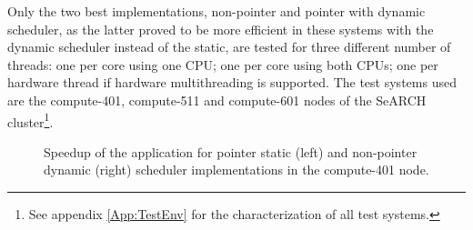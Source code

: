 Only the two best implementations, non-pointer and pointer with dynamic scheduler, as the latter proved to be more efficient in these systems with the dynamic scheduler instead of the static, are tested for three different number of threads: one per core using one CPU; one per core using both CPUs; one per hardware thread if hardware multithreading is supported. The test systems used are the compute-401, compute-511 and compute-601 nodes of the SeARCH cluster\footnote{See appendix \ref{App:TestEnv} for the characterization of all test systems.}.

\begin{figure}[!htp]
	\begin{center}
		\caption{Speedup of the \tth application for pointer static (left) and non-pointer dynamic (right) scheduler implementations in the compute-401 node.}
		\label{fig:Speedup401}
	\end{center}
\end{figure}

